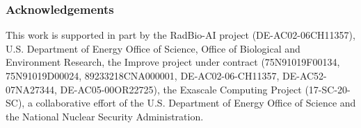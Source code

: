\clearpage
\subsubsection*{Acknowledgements}
This work is supported in part by the RadBio-AI project (DE-AC02-06CH11357), U.S. Department of Energy Office of Science, Office of Biological and Environment Research, the Improve project under contract (75N91019F00134, 75N91019D00024, 89233218CNA000001, DE-AC02-06-CH11357, DE-AC52-07NA27344, DE-AC05-00OR22725), 
the Exascale Computing Project (17-SC-20-SC), a collaborative effort of the U.S. Department of Energy Office of Science and the National Nuclear Security Administration.




